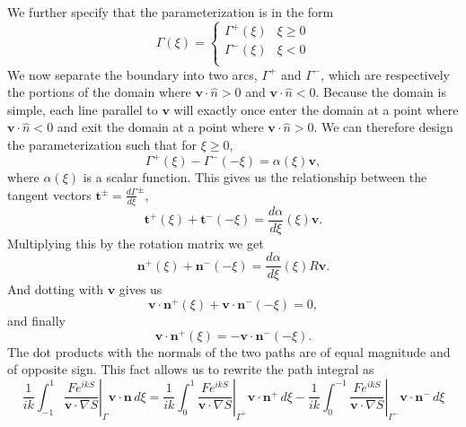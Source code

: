 \documentclass{article}
\theoremstyle{plain}
\begin{document}
We further specify that the parameterization is in the form
\begin{equation}
	\Gamma(\xi) = 
	\begin{cases} 
		\Gamma^+(\xi) & \xi \geq 0 \\
		\Gamma^-(\xi) & \xi < 0 \\
	\end{cases}
\end{equation}
We now separate the boundary into two arcs, $\Gamma^+$ and $\Gamma^-$,
which are respectively the portions of the domain where $\mathbf{v}\cdot\hat{n} > 0$ and $\mathbf{v}\cdot\hat{n} < 0$.
Because the domain is simple, each line parallel to $\mathbf{v}$ will exactly once enter the domain at a point where $\mathbf{v}\cdot\hat{n} < 0$
and exit the domain at a point where $\mathbf{v}\cdot\hat{n} > 0$.
We can therefore design the parameterization such that for $\xi \geq 0$,
\begin{equation}
	\Gamma^+(\xi) - \Gamma^-(-\xi) = \alpha(\xi)\mathbf{v},
\end{equation}
where $\alpha(\xi)$ is a scalar function.
This gives us the relationship between the tangent vectors $\mathbf{t}^\pm = \frac{d\Gamma}{d\xi}^\pm$,
\begin{equation}
	\mathbf{t}^+(\xi) + \mathbf{t}^-(-\xi) = \frac{d\alpha}{d\xi}(\xi)\mathbf{v}.
\end{equation}
Multiplying this by the rotation matrix we get
\begin{equation}
	\mathbf{n}^+(\xi) + \mathbf{n}^-(-\xi) = \frac{d\alpha}{d\xi}(\xi)R\mathbf{v}.
\end{equation}
And dotting with $\mathbf{v}$ gives us
\begin{equation}
	\mathbf{v}\cdot\mathbf{n}^+(\xi) + \mathbf{v}\cdot\mathbf{n}^-(-\xi) = 0,
\end{equation}
and finally
\begin{equation}
	\mathbf{v}\cdot\mathbf{n}^+(\xi) = -\mathbf{v}\cdot\mathbf{n}^-(-\xi).
\end{equation}
The dot products with the normals of the two paths are of equal magnitude and of opposite sign.
This fact allows us to rewrite the path integral as
\begin{equation}
	\frac{1}{ik} \int_{-1}^1 \left. \frac{Fe^{ikS}}{\mathbf{v}\cdot\nabla S} \right\rvert_{\Gamma} \mathbf{v}\cdot \mathbf{n} \,d\xi
	= \frac{1}{ik} \int_{0}^1 \left. \frac{Fe^{ikS}}{\mathbf{v}\cdot\nabla S} \right\rvert_{\Gamma^+} \mathbf{v}\cdot \mathbf{n}^+ \,d\xi
	- \frac{1}{ik} \int_{0}^{-1} \left. \frac{Fe^{ikS}}{\mathbf{v}\cdot\nabla S} \right\rvert_{\Gamma^-} \mathbf{v}\cdot \mathbf{n}^- \,d\xi
\end{equation}
\end{document}
